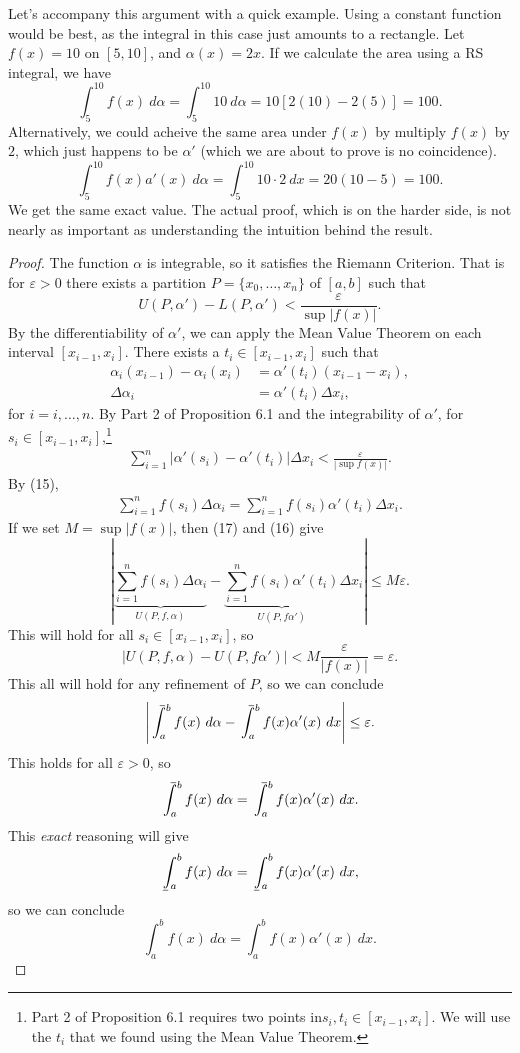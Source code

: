 \documentclass{article}
\def\upint{\mathchoice%
	{\mkern13mu\overline{\vphantom{\intop}\mkern7mu}\mkern-20mu}%
	{\mkern7mu\overline{\vphantom{\intop}\mkern7mu}\mkern-14mu}%
	{\mkern7mu\overline{\vphantom{\intop}\mkern7mu}\mkern-14mu}%
	{\mkern7mu\overline{\vphantom{\intop}\mkern7mu}\mkern-14mu}%
	\int}
\def\lowint{\mkern3mu\underline{\vphantom{\intop}\mkern7mu}\mkern-10mu\int}
\theoremstyle{definition}
\begin{document}
Let's accompany this argument with a quick example. Using a constant function would be best, as the integral in this case just amounts to a rectangle. Let $ f(x)=10 $ on $ [5,10] $, and $ \alpha(x)=2x $. If we calculate the area using a RS integral, we have $$ \int_{5}^{10}f(x)\ d\alpha=\int_{5}^{10}10\ d\alpha=10[2(10)-2(5)]=100.$$ Alternatively, we could acheive the same area under $ f(x) $ by multiply $ f(x) $ by $ 2 $, which just happens to be $ \alpha' $ (which we are about to prove is no coincidence).
$$ \int_{5}^{10}f(x)a'(x)\ d\alpha=\int_{5}^{10}10\cdot 2\ dx=20(10-5)=100.$$
We get the same exact value. The actual proof, which is on the harder side, is not nearly as important as understanding the intuition behind the result. 
\begin{proof}
The function $ \alpha $ is integrable, so it satisfies the Riemann Criterion. That is for $ \varepsilon>0 $ there exists a partition $ P=\{x_0,\ldots,x_n\} $ of $ [a,b] $ such that $$ U(P,\alpha')-L(P,\alpha')<\frac{\varepsilon}{\sup |f(x)|}.$$ 
By the differentiability of $ \alpha' $, we can apply the Mean Value Theorem on each interval $ [x_{i-1},x_i] $. There exists a $ t_i\in[x_{i-1},x_i] $ such that
\begin{align}
	\alpha_i(x_{i-1})-\alpha_i(x_i)&=\alpha'(t_i)(x_{i-1}-x_i),\nonumber\\\Delta\alpha_i&=\alpha'(t_i)\Delta x_i,
\end{align}
for $ i=i,\ldots,n $. By Part 2 of Proposition 6.1 and the integrability of $ \alpha' $, for $ s_i\in [x_{i-1},x_i]$,\footnote{Part 2 of Proposition 6.1 requires two points in$ s_i,t_i\in [x_{i-1},x_i]$. We will use the $ t_i $ that we found using the Mean Value Theorem.}
\begin{align}
\sum_{i=1}^n|\alpha'(s_i)-\alpha'(t_i)|\Delta x_i<\frac{\varepsilon}{|\sup f(x)|}.
\end{align}
By (15), \begin{align}
	\sum_{i=1}^nf(s_i)\Delta \alpha_i=\sum_{i=1}^nf(s_i)\alpha'(t_i)\Delta x_i.
\end{align}
If we set $ M=\sup|f(x)| $, then (17) and (16) give $$ \left\lvert\underbrace{\sum_{i=1}^nf(s_i)\Delta \alpha_i}_{U(P,f,\alpha)}-\underbrace{\sum_{i=1}^nf(s_i)\alpha'(t_i)}_{U(P,f\alpha')}\Delta x_i \right\rvert\le M\varepsilon.$$ This will hold for all $ s_i\in[x_{i-1},x_i] $, so $$|U(P,f,\alpha)-U(P,f\alpha')|< M\frac{\varepsilon}{|f(x)|}=\varepsilon. $$ This all will hold for any refinement of $ P $, so we can conclude $$\left\lvert \upint_{a}^bf(x)\ d\alpha-\upint_{a}^bf(x)\alpha'(x)\ dx \right\rvert\le\varepsilon .$$ This holds for all $ \varepsilon>0 $, so $$  \upint_{a}^bf(x)\ d\alpha=\upint_{a}^bf(x)\alpha'(x)\ dx.$$ This \textit{exact} reasoning will give $$\lowint_{a}^bf(x)\ d\alpha=\lowint_{a}^bf(x)\alpha'(x)\ dx,$$ so we can conclude $$ \int_{a}^bf(x)\ d\alpha=\int_{a}^bf(x)\alpha'(x)\ dx.$$
\end{proof}   
\end{document}
